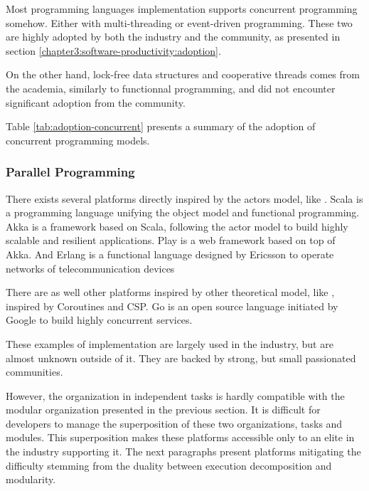 Most programming languages implementation supports concurrent programming somehow.
Either with multi-threading or event-driven programming.
These two are highly adopted by both the industry and the community, as presented in section \ref{chapter3:software-productivity:adoption}.

On the other hand, lock-free data structures and cooperative threads comes from the academia, similarly to functionnal programming, and did not encounter significant adoption from the community.

Table \ref{tab:adoption-concurrent} presents a summary of the adoption of concurrent programming models.


\subsubsection{Parallel Programming}

There exists several platforms directly inspired by the actors model, like .
Scala is a programming language unifying the object model and functional programming.
Akka is a framework based on Scala, following the actor model to build highly scalable and resilient applications.
Play is a web framework based on top of Akka.
And Erlang is a functional language designed by Ericsson to operate networks of telecommunication devices \cite{Armstrong1993,Nelson2004,Armstrong2014}

There are as well other platforms inspired by other theoretical model, like , inspired by Coroutines and CSP.
Go is an open source language initiated by Google to build highly concurrent services.

These examples of implementation are largely used in the industry, but are almost unknown outside of it.
They are backed by strong, but small passionated communities.

However, the organization in independent tasks is hardly compatible with the modular organization presented in the previous section.
It is difficult for developers to manage the superposition of these two organizations, tasks and modules.
This superposition makes these platforms accessible only to an elite in the industry supporting it.
The next paragraphs present platforms mitigating the difficulty stemming from the duality between execution decomposition and modularity.

